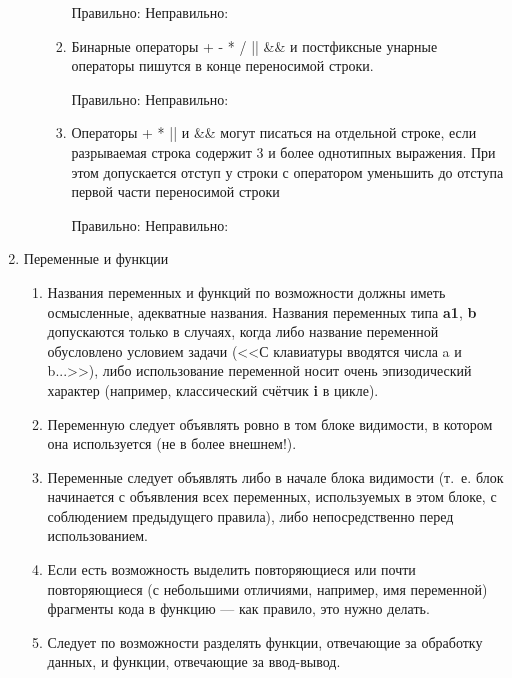 \begin{enumerate}
\begin{enumerate}
\begin{enumerate}
						Правильно:
						Неправильно:

					\item
						Бинарные операторы + - * / || \&\& и постфиксные унарные операторы пишутся в конце переносимой строки.

						Правильно:
						Неправильно:

					\item
						Операторы + * || и \&\& могут писаться на отдельной строке,
						если разрываемая строка содержит 3 и более однотипных выражения.
						При этом допускается отступ у строки с оператором уменьшить до отступа первой части переносимой строки

						Правильно:
						Неправильно:

				\end{enumerate}



		\end{enumerate}
	\item
		Переменные и функции
		\begin{enumerate}
			\item
				Названия переменных и функций по возможности должны иметь осмысленные, адекватные названия.
				Названия переменных типа \textbf{a1}, \textbf{b} допускаются только в случаях,
				когда либо название переменной обусловлено условием задачи (<<С клавиатуры вводятся числа a и b...>>),
				либо использование переменной носит очень эпизодический характер (например, классический счётчик \textbf{i} в цикле).
			\item
				Переменную следует объявлять ровно в том блоке видимости, в котором она используется (не в более внешнем!).
			\item
				Переменные следует объявлять либо в начале блока видимости
				(т.~е. блок начинается с объявления всех переменных, используемых в этом блоке, с соблюдением предыдущего правила),
				либо непосредственно перед использованием.
			\item
				Если есть возможность выделить повторяющиеся или почти повторяющиеся (с небольшими отличиями, например, имя переменной)
				фрагменты кода в функцию --- как правило, это нужно делать.
			\item
				Следует по возможности разделять функции, отвечающие за обработку данных,
				и функции, отвечающие за ввод-вывод.
		\end{enumerate}
\end{enumerate}






